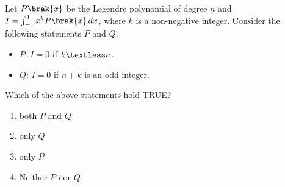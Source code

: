     \item Let $P\brak{x}$ be the Legendre polynomial of degree $n$ and $I = \int_{-1}^{1} x^k P\brak{x} \, dx$, where $k$ is a non-negative integer. Consider the following statements $P$ and $Q$:
    \begin{itemize}
        \item $P$: $I = 0$ if $k \textless n$.
        \item $Q$: $I = 0$ if $n + k$ is an odd integer.
    \end{itemize}
    Which of the above statements hold TRUE?
    \begin{enumerate}
       
        \item both $P$ and $Q$
        \item only $Q$
        \item only $P$
        \item Neither $P$ nor $Q$
    \end{enumerate}


